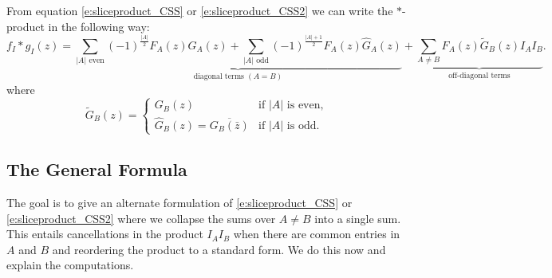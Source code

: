 \documentclass[11pt]{amsart}
\begin{document}
From equation \eqref{e:sliceproduct_CSS} or \eqref{e:sliceproduct_CSS2} we can write the $\ast$-product in the following way:
\[
f_I * g_I(z) = \underbrace{\sum_{|A| \text{ even}} (-1)^{\frac{|A|}{2}} F_A(z) G_A(z) + \sum_{|A| \text{ odd}} (-1)^{\frac{|A|+1}{2}} F_A(z) \hat{G}_A(z)}_{\text{diagonal terms } (A = B)} + \underbrace{\sum_{A \neq B} F_A(z) \tilde{G}_B(z) I_A I_B}_{\text{off-diagonal terms}}.
\]
where
\[
\tilde{G}_B(z) =
\begin{cases}
G_B(z) & \text{if } |A| \text{ is even}, \\
\hat{G}_B(z) = \overline{G_B(\bar{z})} & \text{if } |A| \text{ is odd}.
\end{cases}
\]



\subsection{The General Formula}

The goal is to give an alternate formulation of \eqref{e:sliceproduct_CSS} or \eqref{e:sliceproduct_CSS2} where we collapse the sums over $A\neq B$ into a single sum.  This entails cancellations in the product $I_AI_B$ when there are common entries in $A$ and $B$ and reordering the product to a standard form.  We do this now and explain the computations.
\end{document}
